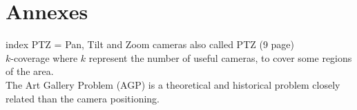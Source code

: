\documentclass[english]{spimubphdthesis}
\begin{document}
 
 
 
 
 
 
%



%

%


 
\listoffigures
 
\listoftables
 
\listofdefinitions

\appendix
\part{Annexes}
 index 
 PTZ = Pan, Tilt and Zoom cameras  also called PTZ  (9 page) \\
 $k$-coverage where $k$ represent the number of useful cameras, to cover some regions of the area.\\
 The Art Gallery Problem (AGP) is a theoretical and historical problem closely related than
the camera positioning.
%
\end{document}
